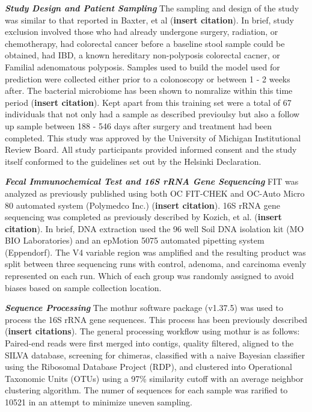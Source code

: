 \documentclass[12pt,]{article}
\begin{document}
\textbf{\emph{Study Design and Patient Sampling}} The sampling and
design of the study was similar to that reported in Baxter, et al
(\textbf{insert citation}). In brief, study exclusion involved those who
had already undergone surgery, radiation, or chemotherapy, had
colorectal cancer before a baseline stool sample could be obtained, had
IBD, a known hereditary non-polyposis colorectal cacner, or Familial
adenomatous polyposis. Samples used to build the model used for
prediction were collected either prior to a colonoscopy or between 1 - 2
weeks after. The bacterial microbiome has been shown to nomralize within
this time period (\textbf{insert citation}). Kept apart from this
training set were a total of 67 individuals that not only had a sample
as described previoulsy but also a follow up sample between 188 - 546
days after surgery and treatment had been completed. This study was
approved by the University of Michigan Institutional Review Board. All
study participants provided informed consent and the study itself
conformed to the guidelines set out by the Helsinki Declaration.

\textbf{\emph{Fecal Immunochemical Test and 16S rRNA Gene Sequencing}}
FIT was analyzed as previously published using both OC FIT-CHEK and
OC-Auto Micro 80 automated system (Polymedco Inc.) (\textbf{insert
citation}). 16S rRNA gene sequencing was completed as previously
described by Kozich, et al. (\textbf{insert citation}). In brief, DNA
extraction used the 96 well Soil DNA isolation kit (MO BIO Laboratories)
and an epMotion 5075 automated pipetting system (Eppendorf). The V4
variable region was amplified and the resulting product was split
between three sequencing runs with control, adenoma, and carcinoma
evenly represented on each run. Which of each group was randomly
assigned to avoid biases based on sample collection location.

\textbf{\emph{Sequence Processing}} The mothur software package
(v1.37.5) was used to process the 16S rRNA gene sequences. This process
has been previously described (\textbf{insert citations}). The general
processing workflow using mothur is as follows: Paired-end reads were
first merged into contigs, quality filtered, aligned to the SILVA
database, screening for chimeras, classified with a naive Bayesian
classifier using the Ribosomal Database Project (RDP), and clustered
into Operational Taxonomic Units (OTUs) using a 97\% similarity cutoff
with an average neighbor clustering algorithm. The numer of sequences
for each sample was rarified to 10521 in an attempt to minimize uneven
sampling.
\end{document}
